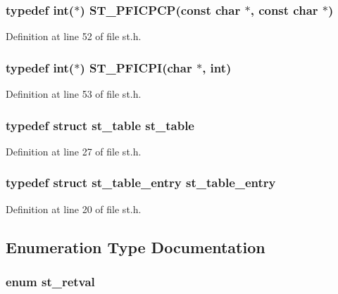 \subsubsection{\setlength{\rightskip}{0pt plus 5cm}typedef int($\ast$) \bf{ST\_\-PFICPCP}(const char $\ast$, const char $\ast$)}\label{st_8h_ca523fe3fbe91b1ce50287af02258ee5}




Definition at line 52 of file st.h.
\subsubsection{\setlength{\rightskip}{0pt plus 5cm}typedef int($\ast$) \bf{ST\_\-PFICPI}(char $\ast$, int)}\label{st_8h_bd9ff0cd475475086281bc65786efa0f}




Definition at line 53 of file st.h.
\subsubsection{\setlength{\rightskip}{0pt plus 5cm}typedef struct \bf{st\_\-table} \bf{st\_\-table}}\label{st_8h_97b5395afafae465d6ada75aae48079d}




Definition at line 27 of file st.h.
\subsubsection{\setlength{\rightskip}{0pt plus 5cm}typedef struct \bf{st\_\-table\_\-entry} \bf{st\_\-table\_\-entry}}\label{st_8h_4bafc81982b39c3f3fa20e5f7b3dbbf5}




Definition at line 20 of file st.h.

\subsection{Enumeration Type Documentation}
\subsubsection{\setlength{\rightskip}{0pt plus 5cm}enum \bf{st\_\-retval}}\label{st_8h_0c6a172fd99de7928916e65034ed8b1f}


